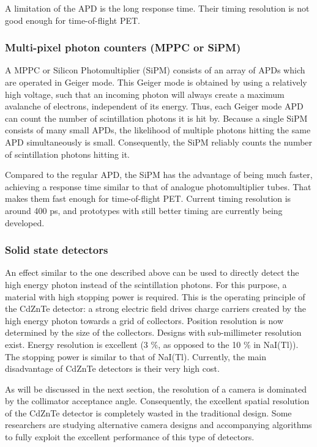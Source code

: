 \documentclass[11pt,oneside]{book}
\begin{document}
A limitation of the APD is the long response time. Their timing
resolution is not good enough for time-of-flight PET.

\subsubsection{Multi-pixel photon counters (MPPC or SiPM)}
A MPPC or Silicon Photomultiplier (SiPM) consists of an array of APDs
which are operated in Geiger mode. This Geiger mode is obtained by
using a relatively high voltage, such that an incoming photon will
always create a maximum avalanche of electrons, independent of its
energy. Thus, each Geiger mode APD can count the number of
scintillation photons it is hit by. Because a single SiPM consists of
many small APDs, the likelihood of multiple photons hitting the same
APD simultaneously is small. Consequently, the SiPM reliably counts
the number of scintillation photons hitting it.

Compared to the regular APD, the SiPM has the advantage of being much
faster, achieving a response time similar to that of analogue
photomultiplier tubes. That makes them fast enough for time-of-flight
PET. Current timing resolution is around 400 ps, and prototypes with
still better timing are currently being developed.

\subsubsection{Solid state detectors}
An effect similar to the one described above can be used to directly
detect the high energy photon instead of the scintillation
photons. For this purpose, a material with high stopping power is
required. This is the operating principle of the CdZnTe detector: a
strong electric field drives charge carriers created by the high
energy photon towards a grid of collectors.  Position resolution is
now determined by the size of the collectors. Designs with
sub-millimeter resolution exist. Energy resolution is excellent (3 \%,
as opposed to the 10 \% in NaI(Tl)). The stopping power is similar to
that of NaI(Tl). Currently, the main disadvantage of CdZnTe detectors
is their very high cost.

As will be discussed in the next section, the resolution of a camera is
dominated by the collimator acceptance angle. Consequently, the excellent
spatial resolution of the CdZnTe detector is completely wasted in the
traditional design. Some researchers are studying alternative camera
designs and accompanying algorithms to fully exploit the excellent
performance of this type of detectors.
\end{document}
